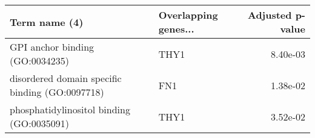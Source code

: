 \begin{tabular}{llr}
\toprule
                                  Term name (4) & Overlapping genes... &  Adjusted p-value \\
\midrule
                GPI anchor binding (GO:0034235) &                 THY1 &          8.40e-03 \\
disordered domain specific binding (GO:0097718) &                  FN1 &          1.38e-02 \\
      phosphatidylinositol binding (GO:0035091) &                 THY1 &          3.52e-02 \\
\bottomrule
\end{tabular}
